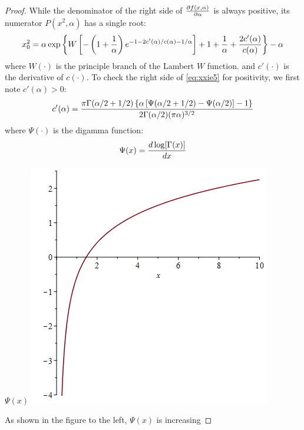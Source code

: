 \begin{subappendices}
\begin{proof}
  While the denominator of the right side of ${\partial f(x, \alpha) \over \partial \alpha}$ is
  always positive, its numerator $P(x^2, \alpha)$ has a single root:
  \begin{equation}
    \label{eq:xxie5}
    x_0^2 = \alpha\exp\left\{
      W\left[
        -\left(1 + {1 \over \alpha}\right)
        e^{-1 - 2 c'(\alpha)/c(\alpha) - 1/\alpha}
      \right]
      + 1 + {1 \over \alpha} + {2 c'(\alpha) \over c(\alpha)}
    \right\} - \alpha
  \end{equation}
  where $W(\cdot)$ is the principle branch of the Lambert $W$
  function. and $c'(\cdot)$ is the derivative of $c(\cdot)$. To check
  the right side of \eqref{eq:xxie5} for positivity, we first note
  $c'(\alpha) > 0$:
  \[
  c'(\alpha) = {
    \pi \Gamma(\alpha/2 + 1/2) \left\{
      \alpha \left[ \Psi(\alpha/2 + 1/2) - \Psi(\alpha/2)\right] - 1
    \right\}
    \over
    2 \Gamma(\alpha/2) (\pi \alpha)^{3/2}
  }
  \]
  where $\Psi(\cdot)$ is the digamma function:
  \[
  \Psi(x) = {d \log[\Gamma(x)] \over d x}
  \]
  \begin{minipage}{0.48\textwidth}
    $\Psi(x)$ \linebreak
    \includegraphics[width=\textwidth]{digamma.png}
  \end{minipage}\hfill
  \begin{minipage}{0.5\textwidth}
    As shown in the figure to the left, $\Psi(x)$ is increasing

\end{minipage}
\end{proof}
\end{subappendices}
